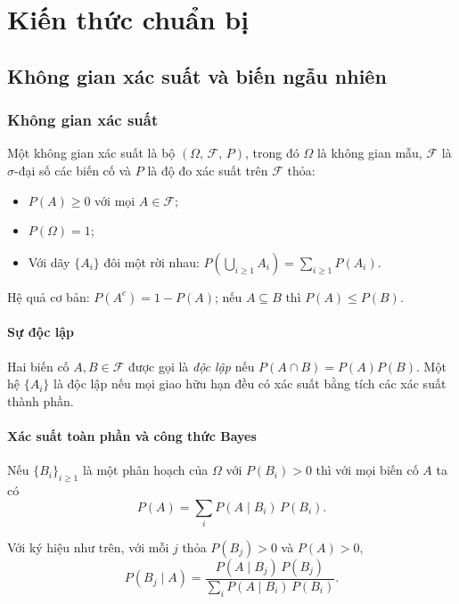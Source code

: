 \chapter{Kiến thức chuẩn bị}

\section{Không gian xác suất và biến ngẫu nhiên}

\subsection{Không gian xác suất}
\begin{dn}
Một không gian xác suất là bộ $(\Omega,\,\mathcal{F},\,P)$, trong đó $\Omega$ là không gian mẫu, $\mathcal{F}$ là $\sigma$-đại số các biến cố và $P$ là độ đo xác suất trên $\mathcal{F}$ thỏa:
\begin{itemize}
    \item $P(A)\ge0$ với mọi $A\in\mathcal{F}$;
    \item $P(\Omega)=1$;
    \item Với dãy $\{A_i\}$ đôi một rời nhau: $P\!\left(\bigcup_{i\ge1}A_i\right)=\sum_{i\ge1}P(A_i)$.
\end{itemize}
\end{dn}
\begin{tinhchat}
Hệ quả cơ bản: $P(A^c)=1-P(A)$; nếu $A\subseteq B$ thì $P(A)\le P(B)$.
\end{tinhchat}

\subsubsection*{Sự độc lập}
\begin{dn}
Hai biến cố $A,B\in\mathcal{F}$ được gọi là \emph{độc lập} nếu $P(A\cap B)=P(A)P(B)$. Một hệ $\{A_i\}$ là độc lập nếu mọi giao hữu hạn đều có xác suất bằng tích các xác suất thành phần.
\end{dn}

\subsubsection*{Xác suất toàn phần và công thức Bayes}
\begin{dl}
Nếu $\{B_i\}_{i\ge1}$ là một phân hoạch của $\Omega$ với $P(B_i)>0$ thì với mọi biến cố $A$ ta có
\[
P(A)=\sum_i P(A\mid B_i)\,P(B_i).
\]
\end{dl}
\begin{dl}
Với ký hiệu như trên, với mỗi $j$ thỏa $P(B_j)>0$ và $P(A)>0$,
\[
P(B_j\mid A)=\frac{P(A\mid B_j)\,P(B_j)}{\sum_i P(A\mid B_i)\,P(B_i)}.
\]
\end{dl}

